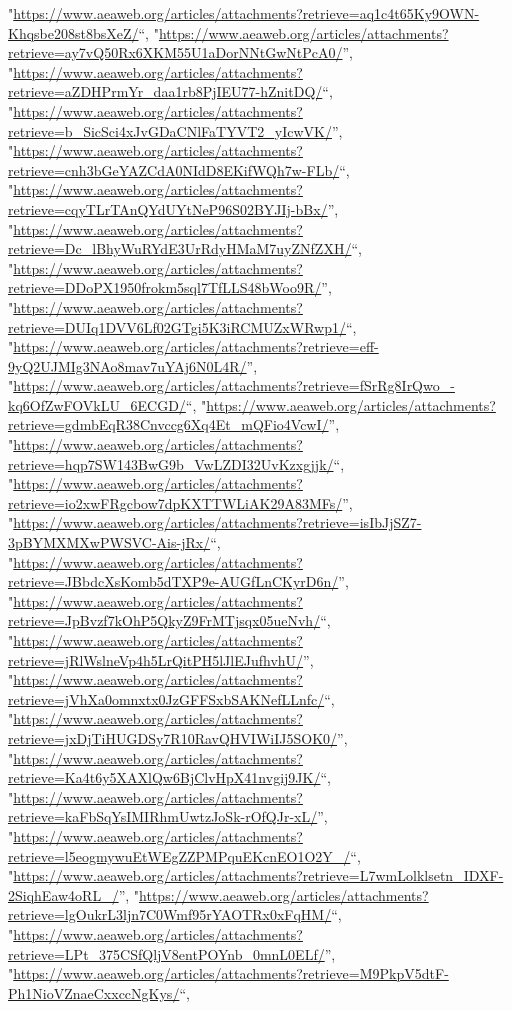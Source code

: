 \documentclass[]{article}
\begin{document}
\begin{itemize}
  "\url{https://www.aeaweb.org/articles/attachments?retrieve=aq1c4t65Ky9OWN-Khqsbe208st8bsXeZ/}``,
  "\url{https://www.aeaweb.org/articles/attachments?retrieve=ay7vQ50Rx6XKM55U1aDorNNtGwNtPcA0/}'',
  "\url{https://www.aeaweb.org/articles/attachments?retrieve=aZDHPrmYr_daa1rb8PjIEU77-hZnitDQ/}``,
  "\url{https://www.aeaweb.org/articles/attachments?retrieve=b_SicSci4xJvGDaCNlFaTYVT2_yIcwVK/}'',
  "\url{https://www.aeaweb.org/articles/attachments?retrieve=cnh3bGeYAZCdA0NIdD8EKifWQh7w-FLb/}``,
  "\url{https://www.aeaweb.org/articles/attachments?retrieve=cqyTLrTAnQYdUYtNeP96S02BYJIj-bBx/}'',
  "\url{https://www.aeaweb.org/articles/attachments?retrieve=Dc_lBhyWuRYdE3UrRdyHMaM7uyZNfZXH/}``,
  "\url{https://www.aeaweb.org/articles/attachments?retrieve=DDoPX1950frokm5sql7TfLLS48bWoo9R/}'',
  "\url{https://www.aeaweb.org/articles/attachments?retrieve=DUIq1DVV6Lf02GTgi5K3iRCMUZxWRwp1/}``,
  "\url{https://www.aeaweb.org/articles/attachments?retrieve=eff-9yQ2UJMIg3NAo8mav7uYAj6N0L4R/}'',
  "\url{https://www.aeaweb.org/articles/attachments?retrieve=fSrRg8IrQwo_-kq6OfZwFOVkLU_6ECGD/}``,
  "\url{https://www.aeaweb.org/articles/attachments?retrieve=gdmbEqR38Cnvccg6Xq4Et_mQFio4VcwI/}'',
  "\url{https://www.aeaweb.org/articles/attachments?retrieve=hqp7SW143BwG9b_VwLZDI32UvKzxgjjk/}``,
  "\url{https://www.aeaweb.org/articles/attachments?retrieve=io2xwFRgcbow7dpKXTTWLiAK29A83MFs/}'',
  "\url{https://www.aeaweb.org/articles/attachments?retrieve=isIbJjSZ7-3pBYMXMXwPWSVC-Ais-jRx/}``,
  "\url{https://www.aeaweb.org/articles/attachments?retrieve=JBbdcXsKomb5dTXP9e-AUGfLnCKyrD6n/}'',
  "\url{https://www.aeaweb.org/articles/attachments?retrieve=JpBvzf7kOhP5QkyZ9FrMTjsqx05ueNvh/}``,
  "\url{https://www.aeaweb.org/articles/attachments?retrieve=jRlWslneVp4h5LrQitPH5lJlEJufhvhU/}'',
  "\url{https://www.aeaweb.org/articles/attachments?retrieve=jVhXa0omnxtx0JzGFFSxbSAKNefLLnfc/}``,
  "\url{https://www.aeaweb.org/articles/attachments?retrieve=jxDjTiHUGDSy7R10RavQHVIWiIJ5SOK0/}'',
  "\url{https://www.aeaweb.org/articles/attachments?retrieve=Ka4t6y5XAXlQw6BjClvHpX41nvgij9JK/}``,
  "\url{https://www.aeaweb.org/articles/attachments?retrieve=kaFbSqYsIMIRhmUwtzJoSk-rOfQJr-xL/}'',
  "\url{https://www.aeaweb.org/articles/attachments?retrieve=l5eogmywuEtWEgZZPMPquEKcnEO1O2Y_/}``,
  "\url{https://www.aeaweb.org/articles/attachments?retrieve=L7wmLolklsetn_IDXF-2SiqhEaw4oRL_/}'',
  "\url{https://www.aeaweb.org/articles/attachments?retrieve=lgOukrL3ljn7C0Wmf95rYAOTRx0xFqHM/}``,
  "\url{https://www.aeaweb.org/articles/attachments?retrieve=LPt_375CSfQljV8entPOYnb_0mnL0ELf/}'',
  "\url{https://www.aeaweb.org/articles/attachments?retrieve=M9PkpV5dtF-Ph1NioVZnaeCxxccNgKys/}``,

\end{itemize}
\end{document}

